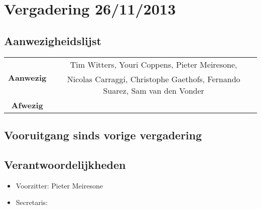 \section{Vergadering 26/11/2013}
\subsection{Aanwezigheidslijst}
\begin{table}[htbp]
	\centering
	\begin{tabular}{c|c}
		\multirow{2}{*}{\textbf{Aanwezig}} & Tim Witters, Youri Coppens, Pieter Meiresone, \\
		& Nicolas Carraggi,  Christophe Gaethofs, Fernando Suarez, Sam van den Vonder \\
		\hline
		\textbf{Afwezig} & \\
	\end{tabular}
\end{table}

\subsection{Vooruitgang sinds vorige vergadering}
\subsection{Verantwoordelijkheden}
\begin{itemize}
	\item Voorzitter: Pieter Meiresone
	\item Secretaris:
\end{itemize}
